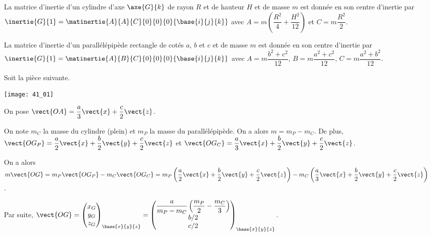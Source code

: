 \normaltrue \difficilefalse \tdifficilefalse
\correctiontrue


\setcounter{question}{0}%
\ifcorrection
\else
{}
\fi

\ifprof
\else
La matrice d'inertie d'un cylindre d'axe $\axe{G}{k}$ de rayon $R$ et de hauteur $H$ et de masse $m$ est donnée en son centre d'inertie par 
$\inertie{G}{1}=\matinertie{A}{A}{C}{0}{0}{0}{\base{i}{j}{k}}$ avec $A=m\left(\dfrac{R^2}{4}+\dfrac{H^2}{12} \right)$ et $C=m\dfrac{R^2}{2}$. 


La matrice d'inertie d'un parallélépipède rectangle de cotés $a$, $b$ et $c$ et de masse $m$ est donnée en son centre d'inertie par 
$\inertie{G}{1}=\matinertie{A}{B}{C}{0}{0}{0}{\base{i}{j}{k}}$ avec $A={m\dfrac{b^2+c^2}{12}}$, $B={m\dfrac{a^2+c^2}{12}}$, $C={m\dfrac{a^2+b^2}{12}}$.

Soit la pièce suivante. 
\begin{marginfigure}
\centering
\texttt{[image: 41\_01]}
\end{marginfigure}

On pose $\vect{OA}=\dfrac{a}{3}\vect{x}+\dfrac{c}{2}\vect{z}$. 

\fi

\ifprof
On note $m_C$ la masse du cylindre (plein) et $m_P$ la masse du parallélépipède. On a alors $m=m_P-m_C$.
De plus, $\vect{OG_P}=\dfrac{a}{2}\vect{x}+\dfrac{b}{2}\vect{y}+\dfrac{c}{2}\vect{z}$
et $\vect{OG_C}=\dfrac{a}{3}\vect{x}+\dfrac{b}{2}\vect{y}+\dfrac{c}{2}\vect{z}$.

On a alors 
$m \vect{OG}=m_P \vect{OG_P}-m_C \vect{OG_C} = m_P \left(\dfrac{a}{2}\vect{x}+\dfrac{b}{2}\vect{y}+\dfrac{c}{2}\vect{z} \right)-m_C \left( \dfrac{a}{3}\vect{x}+\dfrac{b}{2}\vect{y}+\dfrac{c}{2}\vect{z}\right) $.

Par suite, 
$\vect{OG}=
\begin{pmatrix}
x_G \\ y_G \\ z_G
\end{pmatrix}_{\base{x}{y}{z}}
=
\begin{pmatrix}
\dfrac{a}{m_P-m_C} \left( \dfrac{m_P}{2} -  \dfrac{m_C}{3}\right) \\
b/2 \\
c/2
\end{pmatrix}_{\base{x}{y}{z}}
$.
\else
\fi

